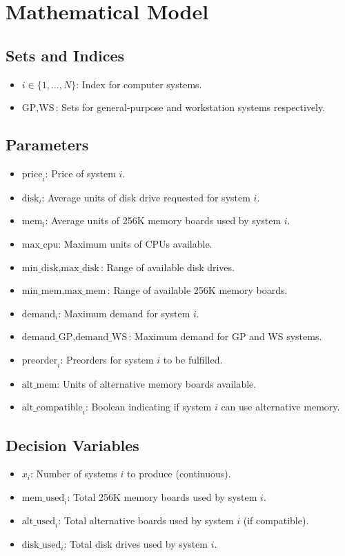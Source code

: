 \documentclass{article}
\begin{document}
\section*{Mathematical Model}

\subsection*{Sets and Indices}
\begin{itemize}
    \item \( i \in \{1, \ldots, N\} \): Index for computer systems.
    \item \( \text{GP}, \text{WS} \): Sets for general-purpose and workstation systems respectively.
\end{itemize}

\subsection*{Parameters}
\begin{itemize}
    \item \( \text{price}_i \): Price of system \( i \).
    \item \( \text{disk}_i \): Average units of disk drive requested for system \( i \).
    \item \( \text{mem}_i \): Average units of 256K memory boards used by system \( i \).
    \item \( \text{max\_cpu} \): Maximum units of CPUs available.
    \item \( \text{min\_disk}, \text{max\_disk} \): Range of available disk drives.
    \item \( \text{min\_mem}, \text{max\_mem} \): Range of available 256K memory boards.
    \item \( \text{demand}_i \): Maximum demand for system \( i \).
    \item \( \text{demand\_GP}, \text{demand\_WS} \): Maximum demand for GP and WS systems.
    \item \( \text{preorder}_i \): Preorders for system \( i \) to be fulfilled.
    \item \( \text{alt\_mem} \): Units of alternative memory boards available.
    \item \( \text{alt\_compatible}_i \): Boolean indicating if system \( i \) can use alternative memory.
\end{itemize}

\subsection*{Decision Variables}
\begin{itemize}
    \item \( x_i \): Number of systems \( i \) to produce (continuous).
    \item \( \text{mem\_used}_i \): Total 256K memory boards used by system \( i \).
    \item \( \text{alt\_used}_i \): Total alternative boards used by system \( i \) (if compatible).
    \item \( \text{disk\_used}_i \): Total disk drives used by system \( i \).
\end{itemize}
\end{document}

